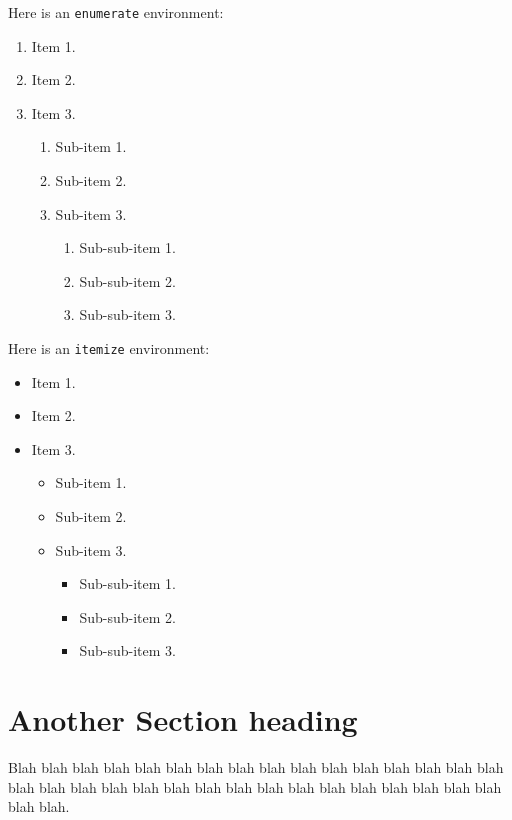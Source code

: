 \documentclass[rd,pdfa]{drdc-report}
\begin{document}
Here is an \texttt{enumerate} environment:
\begin{enumerate}
 \item Item 1.
 \item Item 2.
 \item Item 3.
 \begin{enumerate}
   \item Sub-item 1.
   \item Sub-item 2.
   \item Sub-item 3.
   \begin{enumerate}
     \item Sub-sub-item 1.
     \item Sub-sub-item 2.
     \item Sub-sub-item 3.
   \end{enumerate}
 \end{enumerate}
\end{enumerate}

Here is an \texttt{itemize} environment:
\begin{itemize}
 \item Item 1.
 \item Item 2.
 \item Item 3.
 \begin{itemize}
   \item Sub-item 1.
   \item Sub-item 2.
   \item Sub-item 3.
   \begin{itemize}
     \item Sub-sub-item 1.
     \item Sub-sub-item 2.
     \item Sub-sub-item 3.
   \end{itemize}
 \end{itemize}
\end{itemize}

\section{Another Section heading}

Blah blah blah blah blah blah blah blah blah blah blah blah blah blah
blah blah blah blah blah blah blah blah blah blah blah blah blah blah
blah blah blah blah blah blah.

\clearpage


 
\appendix
{}
\end{document}
